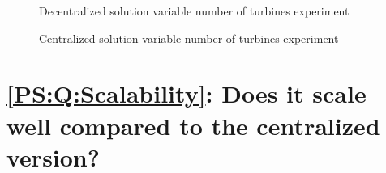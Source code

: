 \begin{figure}
	
	\caption{Decentralized solution variable number of turbines experiment}
	\label{fig:exp:decen:turbines}
\end{figure}


\begin{figure}
	
	\caption{Centralized solution variable number of turbines experiment}
	\label{fig:exp:cen:turbines}
\end{figure}

\section{\ref{PS:Q:Scalability}: Does it scale well compared to the centralized version?}
